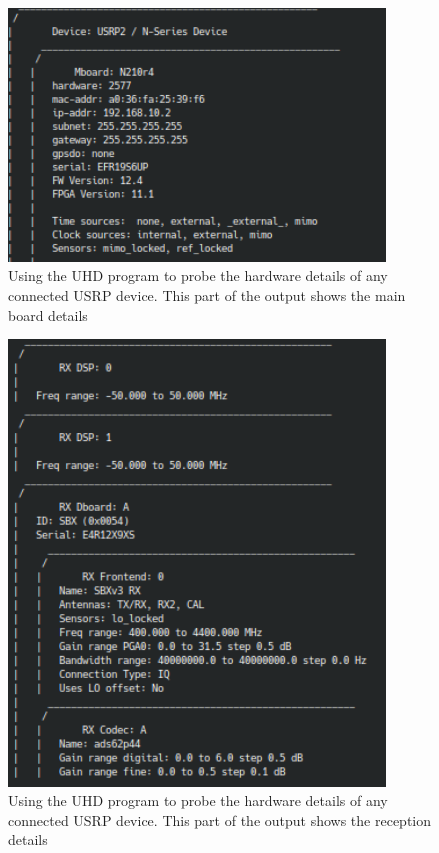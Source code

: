 \begin{figure}[H]
    \begin{centering}
        \includegraphics[width=10cm,keepaspectratio]{Figures/usrp-probe-output_1.png}
        \caption{Using the UHD program to probe the hardware details of any connected USRP device. This part of the output shows the main board details}
    \label{fig:UHDProbe1}
    \end{centering}
\end{figure}

\begin{figure}[H]
    \begin{centering}
        \includegraphics[width=10cm,keepaspectratio]{Figures/usrp-probe-output_2.png}
        \caption{Using the UHD program to probe the hardware details of any connected USRP device. This part of the output shows the reception details}
    \label{fig:UHDProbe2}
    \end{centering}
\end{figure}

